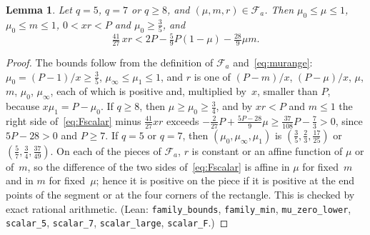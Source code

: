 \documentclass[11pt]{article}
\newtheorem{lemma}[theorem]{Lemma}
\theoremstyle{remark}
\begin{document}
\begin{lemma}\label{lem:Fscalar}
Let $q=5$, $q=7$ or $q\ge8$, and $(\mu,m,r)\in\mathcal F_a$. Then
$\mu_0\le\mu\le1$, $\mu_0\le m\le1$, $0<xr<P$ and $\mu_0\ge\frac35$, and
\begin{equation}\label{eq:Fscalar}
\tfrac{41}{27}\,xr<2P-\tfrac59P(1-\mu)-\tfrac{28}9\mu m.
\end{equation}
\end{lemma}
\begin{proof}
The bounds follow from the definition of $\mathcal F_a$ and~\eqref{eq:murange}:
$\mu_0=(P-1)/x\ge\frac35$, $\mu_\infty\le\mu_1\le1$, and $r$ is one of $(P-m)/x$,
$(P-\mu)/x$, $\mu$, $m$, $\mu_0$, $\mu_\infty$, each of which is positive and,
multiplied by~$x$, smaller than $P$, because $x\mu_1=P-\mu_0$. If $q\ge8$, then
$\mu\ge\mu_0\ge\frac34$, and by $xr<P$ and $m\le1$ the right side
of~\eqref{eq:Fscalar} minus $\frac{41}{27}xr$ exceeds
$-\frac2{27}P+\frac{5P-28}9\mu\ge\frac{37}{108}P-\frac73>0$, since $5P-28>0$
and $P\ge7$. If $q=5$ or $q=7$, then $(\mu_0,\mu_\infty,\mu_1)$ is
$(\frac35,\frac23,\frac{17}{25})$ or $(\frac57,\frac34,\frac{37}{49})$. On each of
the pieces of $\mathcal F_a$, $r$ is constant or an affine function of $\mu$ or
of~$m$, so the difference of the two sides of~\eqref{eq:Fscalar} is affine in
$\mu$ for fixed~$m$ and in $m$ for fixed~$\mu$; hence it is positive on the piece
if it is positive at the end points of the segment or at the four corners of the
rectangle. This is checked by exact rational arithmetic. (Lean:
\texttt{family\_bounds}, \texttt{family\_min}, \texttt{mu\_zero\_lower},
\texttt{scalar\_5}, \texttt{scalar\_7}, \texttt{scalar\_large},
\texttt{scalar\_F}.)
\end{proof}
\end{document}
